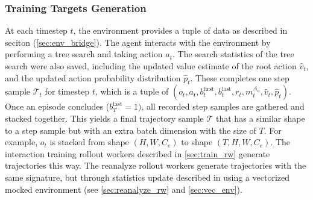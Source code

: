 \documentclass[12pt]{article}
\begin{document}
\subsubsection{Training Targets Generation} \label{sec:targets}
At each timestep $t$, the environment provides a tuple of data as described in seciton (\ref{sec:env_bridge}).
The agent interacts with the environment by performing a tree search and taking action $a_t$.
The search statistics of the tree search were also saved, including the updated value estimate of the root action $\hat{v}_t$,
and the updated action probability distribution $\hat{p}_t$.
These completes one step sample $\mathcal{T}_t$ for timestep $t$, which is a tuple of $(o_t, a_t, b^{\text{first}}_{t}, b^{\text{last}}_{t}, r_t, m^{A_a}_t, \hat{v}_t, \hat{p}_t)$.
Once an episode concludes ($b^{\text{last}}_{T} = 1)$, all recorded step samples are gathered and stacked together.
This yields a final trajectory sample $\mathcal{T}$ that has a similar shape to a step sample but with an extra batch dimension with the size of $T$.
For example, $o_t$ is stacked from shape $(H, W, C_e)$ to shape $(T, H, W, C_e)$.
The interaction training rollout workers described in \ref{sec:train_rw} generate trajectories this way.
The reanalyze rollout workers generate trajectories with the same signature, but through statistics update described in using a vectorized mocked environment (see \ref{sec:reanalyze_rw} and \ref{sec:vec_env}).
\end{document}
